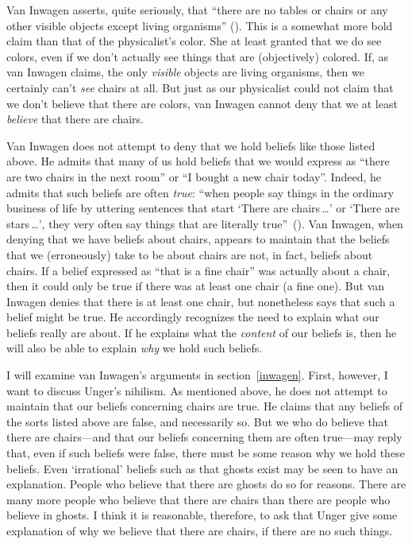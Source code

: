 \documentclass[11pt]{standalone}
\begin{document}
\begin{spacing}{1.5}
Van Inwagen asserts, quite seriously, that ``there are no tables or
chairs or any other visible objects except living organisms''
(\citeyear[1]{inwagen1995}).  This is a somewhat more bold claim than
that of the physicalist's color.  She at least granted that we do see
colors, even if we don't actually see things that are (objectively)
colored.  If, as van Inwagen claims, the only {\em visible} objects
are living organisms, then we certainly can't {\em see} chairs at all.
But just as our physicalist could not claim that we don't believe that
there are colors, van Inwagen cannot deny that we at least {\em
  believe} that there are chairs.

Van Inwagen does not attempt to deny that we hold beliefs like those
listed above.  He admits that many of us hold beliefs that we would
express as ``there are two chairs in the next room'' or ``I bought a
new chair today''.  Indeed, he admits that such beliefs are often {\em
  true}: ``when people say things in the ordinary business of life by
uttering sentences that start `There are chairs\,\ldots ' or `There
are stars\,\ldots ', they very often say things that are literally
true''~(\citeyear[102]{inwagen1995}).  Van Inwagen, when denying that
we have beliefs about chairs, appears to maintain that the beliefs
that we (erroneously) take to be about chairs are not, in fact,
beliefs about chairs.  If a belief expressed as ``that is a fine
chair'' was actually about a chair, then it could only be true if
there was at least one chair (a fine one).  But van Inwagen denies
that there is at least one chair, but nonetheless says that such a
belief might be true.  He accordingly recognizes the need to explain
what our beliefs really are about.  If he explains what the {\em
  content} of our beliefs is, then he will also be able to explain
{\em why} we hold such beliefs.

I will examine van Inwagen's arguments in section~\ref{inwagen}.
First, however, I want to discuss Unger's nihilism.  As mentioned
above, he does not attempt to maintain that our beliefs concerning
chairs are true.  He claims that any beliefs of the sorts listed above
are false, and necessarily so.  But we who do believe that there are
chairs---and that our beliefs concerning them are often true---may
reply that, even if such beliefs were false, there must be some reason
why we hold these beliefs.  Even `irrational' beliefs such as that
ghosts exist may be seen to have an explanation.  People who believe
that there are ghosts do so for reasons.  There are many more people
who believe that there are chairs than there are people who believe in
ghosts.  I think it is reasonable, therefore, to ask that Unger give
some explanation of why we believe that there are chairs, if there are
no such things.
\ifstandalone
\end{spacing}


\fi
\end{document}
